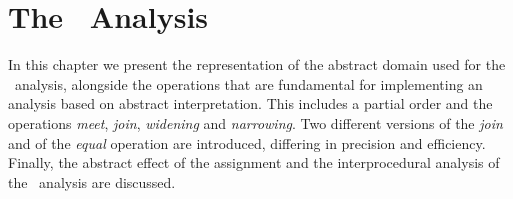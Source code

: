 \chapter{The \cpo\ Analysis}\label{chapter:analysis}

In this chapter we present the representation of the abstract domain used for the \cpo\ analysis, alongside the operations that are fundamental for implementing an analysis based on abstract interpretation.
This includes a partial order and the operations \emph{meet}, \emph{join}, \emph{widening} and \emph{narrowing}.
Two different versions of the \emph{join} and of the \emph{equal} operation are introduced,
differing in precision and efficiency.
Finally, the abstract effect of the assignment and the interprocedural analysis of the \cpo\ analysis are discussed.






